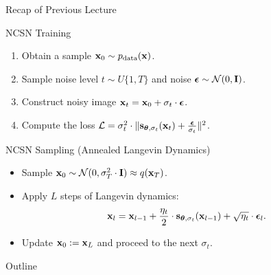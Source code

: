 \documentclass{beamer}
\begin{document}
\begin{frame}{Recap of Previous Lecture}
    \begin{block}{NCSN Training}
        \begin{enumerate}
            \item Obtain a sample $\mathbf{x}_0 \sim p_{\text{data}}(\mathbf{x})$.
            \item Sample noise level $t \sim U\{1, T\}$ and noise $\boldsymbol{\epsilon} \sim \mathcal{N}(0, \mathbf{I})$.
            \item Construct noisy image $\mathbf{x}_t = \mathbf{x}_0 + \sigma_t \cdot \boldsymbol{\epsilon}$.
            \item Compute the loss $ \mathcal{L} = \sigma_t^2 \cdot \| \mathbf{s}_{\boldsymbol{\theta}, \sigma_t}(\mathbf{x}_t) + \frac{\boldsymbol{\epsilon}}{\sigma_t} \|^2 $.
        \end{enumerate}
    \end{block}
    \begin{block}{NCSN Sampling (Annealed Langevin Dynamics)}
        \begin{itemize}
            \item Sample $\mathbf{x}_0 \sim \mathcal{N}(0, \sigma_T^2 \cdot \mathbf{I}) \approx q(\mathbf{x}_T)$.
            \item Apply $L$ steps of Langevin dynamics:
            \vspace{-0.2cm}
            \[
                \mathbf{x}_l = \mathbf{x}_{l-1} + \frac{\eta_t}{2} \cdot \mathbf{s}_{\boldsymbol{\theta}, \sigma_t}(\mathbf{x}_{l - 1}) + \sqrt{\eta_t} \cdot \boldsymbol{\epsilon}_l.
            \] 
            \vspace{-0.5cm}
            \item Update $\mathbf{x}_0 := \mathbf{x}_L$ and proceed to the next $\sigma_t$.
        \end{itemize}
    \end{block}
\end{frame}
\begin{frame}{Outline}
	\tableofcontents
\end{frame}
\end{document}
